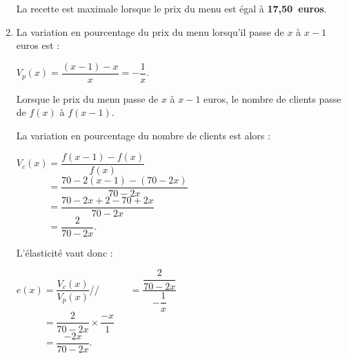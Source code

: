 \begin{corrige}
\begin{enumerate}
          La recette est maximale lorsque le prix du menu est égal à \textbf{17,50~euros}.
          \item %
          La variation en pourcentage du prix du menu lorsqu'il passe de $x$ à $x-1$ euros est :
          \par
          $V_p(x)=\dfrac{(x-1)-x}{x}=-\dfrac{1}{x}$.
          \par
          Lorsque le prix du menu passe de $x$ à $x-1$ euros, le nombre de clients passe de $f(x)$ à $f(x-1)$.
          \par
          La variation en pourcentage du nombre de clients est alors :
          \par
          $V_c(x)=\dfrac{f(x-1)-f(x)}{f(x)}$\\
          $\phantom{V_c(x)}=\dfrac{70-2(x-1)-(70-2x)}{70-2x}$\\
          $\phantom{V_c(x)}=\dfrac{70-2x+2-70+2x}{70-2x}$\\
          $\phantom{V_c(x)}=\dfrac{2}{70-2x}.$
          \par
          L'élasticité vaut donc :
          \par
          $e(x)=\dfrac{V_c(x)}{V_p(x)}$//
          $\phantom{e(x)}=\dfrac{\dfrac{2}{70-2x}}{-\dfrac{1}{x}}$\\
          $\phantom{e(x)}=\dfrac{2}{70-2x} \times \dfrac{-x}{1}$\\
          $\phantom{e(x)}=\dfrac{-2x}{70-2x}.$
          \par


\end{enumerate}
\end{corrige}
